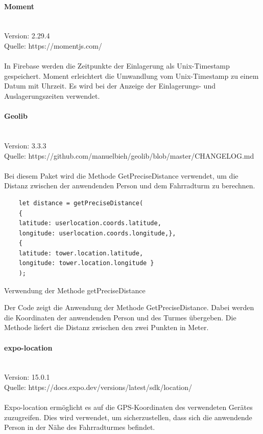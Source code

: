 \paragraph{Moment}\mbox{}\\
Version: 2.29.4\\ Quelle: https://momentjs.com/\\ \\
In Firebase werden die Zeitpunkte der Einlagerung als \Gls{Unix-Timestamp} gespeichert. Moment erleichtert die Umwandlung vom \Gls{Unix-Timestamp} zu einem Datum mit Uhrzeit. Es wird bei der Anzeige der Einlagerungs- und Auslagerungszeiten verwendet. \\

\paragraph{Geolib}\mbox{}\\
Version: 3.3.3\\ Quelle: https://github.com/manuelbieh/geolib/blob/master/CHANGELOG.md\\ \\
Bei diesem Paket wird die Methode GetPreciseDistance verwendet, um die Distanz zwischen der anwendenden Person und dem Fahrradturm zu berechnen. \\
\begin{listing}[H]
  \begin{verbatim}
    let distance = getPreciseDistance(
    {
    latitude: userlocation.coords.latitude,
    longitude: userlocation.coords.longitude,},
    { 
    latitude: tower.location.latitude, 
    longitude: tower.location.longitude }
    );
\end{verbatim}
  \caption{Verwendung der Methode getPreciseDistance}
  \label{lst:getprecisedistance}
\end{listing}
Der Code zeigt die Anwendung der Methode GetPreciseDistance. Dabei werden die Koordinaten der anwendenden Person und des Turmes übergeben. Die Methode liefert die Distanz zwischen den zwei Punkten in Meter.

\paragraph{expo-location}\mbox{}\\
Version: 15.0.1\\
Quelle: https://docs.expo.dev/versions/latest/sdk/location/ \\ \\
Expo-location ermöglicht es auf die GPS-Koordinaten des verwendeten Gerätes zuzugreifen. Dies wird verwendet, um sicherzustellen, dass sich die anwendende Person in der Nähe des Fahrradturmes befindet. \\


